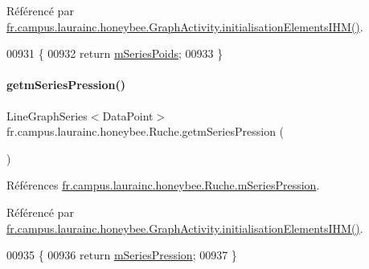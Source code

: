 Référencé par \hyperlink{classfr_1_1campus_1_1laurainc_1_1honeybee_1_1_graph_activity_a7000895983725c6f795f7c73c1fafd20}{fr.\+campus.\+laurainc.\+honeybee.\+Graph\+Activity.\+initialisation\+Elements\+I\+H\+M()}.


\begin{DoxyCode}
00931                                                         \{
00932         \textcolor{keywordflow}{return} \hyperlink{classfr_1_1campus_1_1laurainc_1_1honeybee_1_1_ruche_ac181c5f8d7cc950c4f015d8abccf44d8}{mSeriesPoids};
00933     \}
\end{DoxyCode}
\mbox{\label{classfr_1_1campus_1_1laurainc_1_1honeybee_1_1_ruche_a237f9b18ebb70839382bc2bfc237b5da}} 
\paragraph{\texorpdfstring{getm\+Series\+Pression()}{getmSeriesPression()}}
{\footnotesize\ttfamily Line\+Graph\+Series$<$Data\+Point$>$ fr.\+campus.\+laurainc.\+honeybee.\+Ruche.\+getm\+Series\+Pression (\begin{DoxyParamCaption}{ }\end{DoxyParamCaption})}



Références \hyperlink{classfr_1_1campus_1_1laurainc_1_1honeybee_1_1_ruche_ab042d6976e773befe0f4beab70951a52}{fr.\+campus.\+laurainc.\+honeybee.\+Ruche.\+m\+Series\+Pression}.



Référencé par \hyperlink{classfr_1_1campus_1_1laurainc_1_1honeybee_1_1_graph_activity_a7000895983725c6f795f7c73c1fafd20}{fr.\+campus.\+laurainc.\+honeybee.\+Graph\+Activity.\+initialisation\+Elements\+I\+H\+M()}.


\begin{DoxyCode}
00935                                                            \{
00936         \textcolor{keywordflow}{return} \hyperlink{classfr_1_1campus_1_1laurainc_1_1honeybee_1_1_ruche_ab042d6976e773befe0f4beab70951a52}{mSeriesPression};
00937     \}
\end{DoxyCode}
\mbox{\label{classfr_1_1campus_1_1laurainc_1_1honeybee_1_1_ruche_ace771aab9a10f7cf13050197a85c41f7}} 
